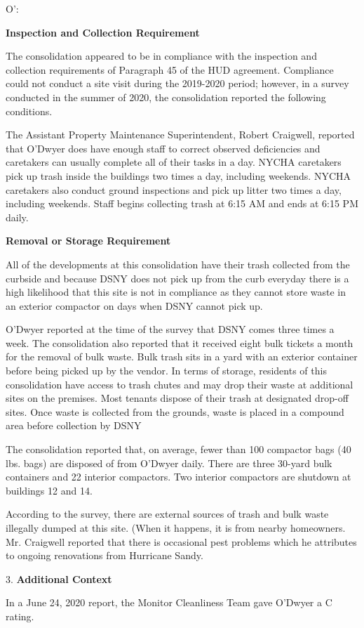 O':

\textbf{Inspection and Collection Requirement}

The consolidation appeared to be in compliance with the inspection and collection requirements of Paragraph 45 of the HUD agreement. Compliance could not conduct a site visit during the 2019-2020 period; however, in a survey conducted in the summer of 2020, the consolidation reported the following conditions.

The Assistant Property Maintenance Superintendent, Robert Craigwell, reported that O'Dwyer does have enough staff to correct observed deficiencies and caretakers can usually complete all of their tasks in a day. NYCHA caretakers pick up trash inside the buildings two times a day, including weekends. NYCHA caretakers also conduct ground inspections and pick up litter two times a day, including weekends. Staff begins collecting trash at 6:15 AM and ends at 6:15 PM daily. 

\textbf{Removal or Storage Requirement}

All of the developments at this consolidation have their trash collected from the curbside and because DSNY does not pick up from the curb everyday there is a high likelihood that this site is not in compliance as they cannot store waste in an exterior compactor on days when DSNY cannot pick up.

O'Dwyer reported at the time of the survey that DSNY comes three times a week. The consolidation also reported that it received eight bulk tickets a month for the removal of bulk waste. Bulk trash sits in a yard with an exterior container before being picked up by the vendor. In terms of storage, residents of this consolidation have access to trash chutes and may drop their waste at  additional sites on the premises. Most tenants dispose of their trash at designated drop-off sites. Once waste is collected from the grounds, waste is placed in a compound area before collection by DSNY

The consolidation reported that, on average, fewer than 100 compactor bags (40 lbs. bags) are disposed of from O'Dwyer daily. There are three 30-yard bulk containers and 22 interior compactors. Two interior compactors are shutdown at buildings 12 and 14.

According to the survey, there are external sources of trash and bulk waste illegally dumped at this site. (When it happens, it is from nearby homeowners. Mr. Craigwell reported that there is occasional pest problems which he attributes to ongoing renovations from Hurricane Sandy.

3. \textbf{Additional Context} 

In a June 24, 2020 report, the Monitor Cleanliness Team gave O'Dwyer a C rating. 